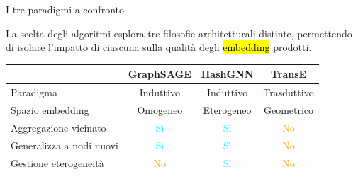 \documentclass{beamer}
\begin{document}
\begin{frame}{I tre paradigmi a confronto}

  La scelta degli algoritmi esplora tre filosofie architetturali
  distinte, permettendo di isolare l'impatto di ciascuna
  sulla qualità degli \hl{embedding} prodotti.

  \vspace{0.8em}

  \begin{center}
  \begin{tabular}{lccc}
    \toprule
    & \textbf{GraphSAGE} & \textbf{HashGNN} & \textbf{TransE} \\
    \midrule
    Paradigma
      & Induttivo & Induttivo & Trasduttivo \\[4pt]
    Spazio embedding
      & Omogeneo & Eterogeneo & Geometrico \\[4pt]
    Aggregazione vicinato
      & \textcolor{Cyan}{Sì} & \textcolor{Cyan}{Sì} & \textcolor{Orange}{No} \\[4pt]
    Generalizza a nodi nuovi
      & \textcolor{Cyan}{Sì} & \textcolor{Cyan}{Sì} & \textcolor{Orange}{No} \\[4pt]
    Gestione eterogeneità
      & \textcolor{Orange}{No} & \textcolor{Cyan}{Sì} & \textcolor{Orange}{No} \\
    \bottomrule
  \end{tabular}
  \end{center}
\end{frame}
\end{document}
